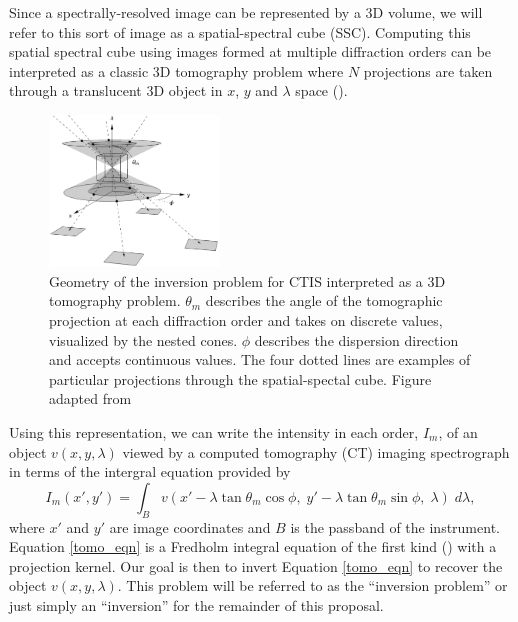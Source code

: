 \documentclass[10pt, letter]{article}
\begin{document}
			Since a spectrally-resolved image can be represented by a 3D volume, we will refer to this sort of image as a spatial-spectral cube (SSC).  Computing this spatial spectral cube using images formed at multiple diffraction orders can be interpreted as a classic 3D tomography problem where $N$ projections are taken through a translucent 3D object in $x$, $y$ and $\lambda$ space (\cite{Bulygin:05}).
			\begin{figure}
				\centering
				\includegraphics[width=0.4\textwidth]{figures/tomography}
				\caption{Geometry of the inversion problem for CTIS interpreted as a 3D tomography problem. $\theta_m$ describes the angle of the tomographic projection at each diffraction order and takes on discrete values, visualized by the nested cones. $\phi$ describes the dispersion direction and accepts continuous values. The four dotted lines are examples of particular projections through the spatial-spectal cube. Figure adapted from \cite{Bulygin:05}}
				\label{tomography}
			\end{figure}
			Using this representation, we can write the intensity in each order, $I_m$, of an object $v(x,y,\lambda)$ viewed by a computed tomography (CT) imaging spectrograph in terms of the intergral equation provided by \cite{fox1}
			\begin{equation}
				I_m (x',y') = \int_B v(x' - \lambda \tan \theta_m \cos \phi, \; y' - \lambda \tan \theta_m \sin \phi, \; \lambda) \; d\lambda,
				\label{tomo_eqn}
			\end{equation}
			where $x'$ and $y'$ are image coordinates and $B$ is the passband of the instrument. Equation \ref{tomo_eqn} is a Fredholm integral equation of the first kind (\cite{RHB}) with a projection kernel. Our goal is then to invert Equation \ref{tomo_eqn} to recover the object $v(x,y,\lambda)$. This problem will be referred to as the ``inversion problem'' or just simply an ``inversion'' for the remainder of this proposal.
			
\end{document}
